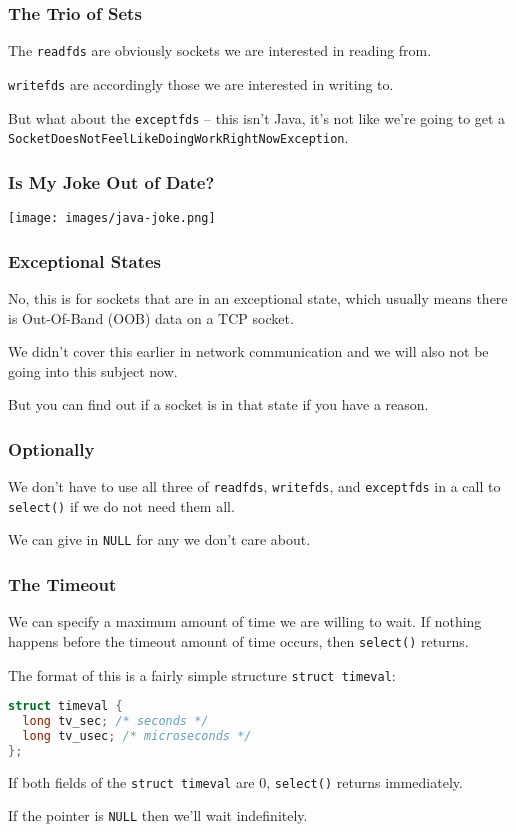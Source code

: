 \begin{frame}
	\frametitle{The Trio of Sets}

	The \texttt{readfds} are obviously sockets we are interested in reading from.

	\texttt{writefds} are accordingly those we are interested in writing to.

	But what about the \texttt{exceptfds} -- this isn't Java, it's not like we're going to get a \texttt{SocketDoesNotFeelLikeDoingWorkRightNowException}.


\end{frame}

\begin{frame}
	\frametitle{Is My Joke Out of Date?}

	\begin{center}
		\texttt{[image: images/java-joke.png]}
	\end{center}

\end{frame}

\begin{frame}
	\frametitle{Exceptional States}

	No, this is for sockets that are in an exceptional state, which usually means there is Out-Of-Band (OOB) data on a TCP socket.

	We didn't cover this earlier in network communication and we will also not be going into this subject now.

	But you can find out if a socket is in that state if you have a reason.

\end{frame}


\begin{frame}
	\frametitle{Optionally}

	We don't have to use all three of \texttt{readfds}, \texttt{writefds}, and \texttt{exceptfds} in a call to \texttt{select()} if we do not need them all.

	We can give in \texttt{NULL} for any we don't care about.

\end{frame}


\begin{frame}[fragile]
	\frametitle{The Timeout}

	We can specify a maximum amount of time we  are willing to wait. If nothing happens before the timeout amount of time occurs, then \texttt{select()} returns.

	The format of this is a fairly simple structure \texttt{struct timeval}:

	\begin{lstlisting}[language=C]
struct timeval {
  long tv_sec; /* seconds */
  long tv_usec; /* microseconds */
};
\end{lstlisting}

	If both fields of the \texttt{struct timeval} are 0, \texttt{select()} returns immediately.

	If the pointer is \texttt{NULL} then we'll wait indefinitely.
\end{frame}


